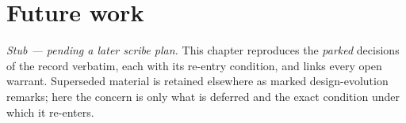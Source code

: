 \chapter{Future work}
\label{ch:future}

\emph{Stub — pending a later scribe plan.} This chapter reproduces the \emph{parked}
decisions of the record verbatim, each with its re-entry condition, and links every
open warrant. Superseded material is retained elsewhere as marked design-evolution
remarks; here the concern is only what is deferred and the exact condition under
which it re-enters.
